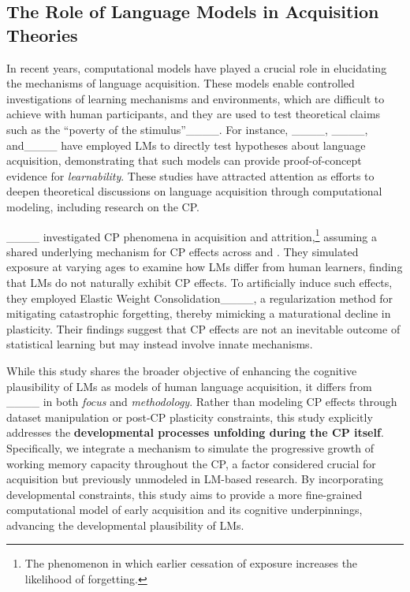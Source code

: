 \subsection{The Role of Language Models in Acquisition Theories}


In recent years, computational models have played a crucial role in elucidating the mechanisms of language acquisition. 
These models enable controlled investigations of learning mechanisms and environments, which are difficult to achieve with human participants, and they are used to test theoretical claims such as the ``poverty of the stimulus''____. 
For instance, ____, ____, and____ have employed LMs to directly test hypotheses about language acquisition, demonstrating that such models can provide proof-of-concept evidence for \textit{learnability}. 
These studies have attracted attention as efforts to deepen theoretical discussions on language acquisition through computational modeling, including research on the CP.


____ investigated CP phenomena in \ltwo acquisition and \lone attrition,\footnote{The phenomenon in which earlier cessation of \lone exposure increases the likelihood of \lone forgetting.} assuming a shared underlying mechanism for CP effects across \lone and \ltwo. 
They simulated \ltwo exposure at varying ages to examine how LMs differ from human learners, finding that LMs do not naturally exhibit CP effects. 
To artificially induce such effects, they employed Elastic Weight Consolidation____, a regularization method for mitigating catastrophic forgetting, thereby mimicking a maturational decline in plasticity. 
Their findings suggest that CP effects are not an inevitable outcome of statistical learning but may instead involve innate mechanisms.


While this study shares the broader objective of enhancing the cognitive plausibility of LMs as models of human language acquisition, it differs from ____ in both \textit{focus} and \textit{methodology}. 
Rather than modeling CP effects through dataset manipulation or post-CP plasticity constraints, this study explicitly addresses the \textbf{developmental processes unfolding during the CP itself}. 
Specifically, we integrate a mechanism to simulate the progressive growth of working memory capacity throughout the CP, a factor considered crucial for \lone acquisition but previously unmodeled in LM-based research. 
By incorporating developmental constraints, this study aims to provide a more fine-grained computational model of early \lone acquisition and its cognitive underpinnings, advancing the developmental plausibility of LMs.